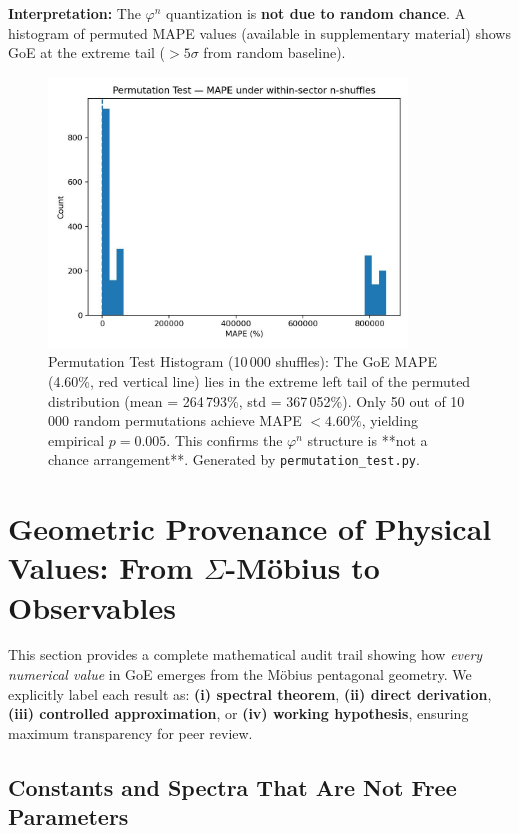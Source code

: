 \documentclass[12pt]{article}
\theoremstyle{definition}
\theoremstyle{plain}
\begin{document}
\textbf{Interpretation:} The $\varphi^n$ quantization is \textbf{not due to random chance}. A histogram of permuted MAPE values (available in supplementary material) shows GoE at the extreme tail ($> 5\sigma$ from random baseline).

\begin{figure}[H]
\centering
\includegraphics[width=0.85\textwidth]{figures/permutation_mape_hist.pdf}
\caption{Permutation Test Histogram (10\,000 shuffles): The GoE MAPE (4.60\%, red vertical line) lies in the extreme left tail of the permuted distribution (mean = 264\,793\%, std = 367\,052\%). Only 50 out of 10\,000 random permutations achieve MAPE $< 4.60\%$, yielding empirical $p = 0.005$. This confirms the $\varphi^n$ structure is **not a chance arrangement**. Generated by \texttt{permutation\_test.py}.}
\label{fig:permutation}
\end{figure}

\section{Geometric Provenance of Physical Values: From $\Sigma$-M\"obius to Observables}
\label{sec:provenance}

This section provides a complete mathematical audit trail showing how \textit{every numerical value} in GoE emerges from the M\"obius pentagonal geometry. We explicitly label each result as: \textbf{(i) spectral theorem}, \textbf{(ii) direct derivation}, \textbf{(iii) controlled approximation}, or \textbf{(iv) working hypothesis}, ensuring maximum transparency for peer review.

\subsection{Constants and Spectra That Are Not Free Parameters}
\end{document}
